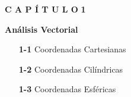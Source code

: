 
\thispagestyle{empty} %

\begin{minipage}[l]{0.35\textwidth}
    \hfill
\end{minipage}
\hfill
\begin{minipage}[c]{0.6\textwidth}
    \begin{flushleft}

        \vspace*{3cm} %

        \begin{center}
            \fontsize{30}{50}\selectfont
            \textbf{C A P Í T U L O}
            \hspace{0.2em}
            \fontsize{90}{100}\selectfont
            \textbf{1}
        \end{center}

        \vspace{1cm} %

        \begin{center}
            \fontsize{40}{60}\selectfont
            \color{LightGray}
            \textbf{Análisis Vectorial}
        \end{center}

        \vspace{2.5cm} %

        \begin{minipage}{0.6\textwidth} %
        \raggedright
        \linespread{1.5}\selectfont %
            \begin{itemize}
                \item[\textbf{1-1}] Coordenadas Cartesianas
                \item[\textbf{1-2}] Coordenadas Cilíndricas
                \item[\textbf{1-3}] Coordenadas Esféricas 
            \end{itemize}
        \end{minipage}

        \vspace*{\fill} %
    \end{flushleft}
\end{minipage}

\newpage %

